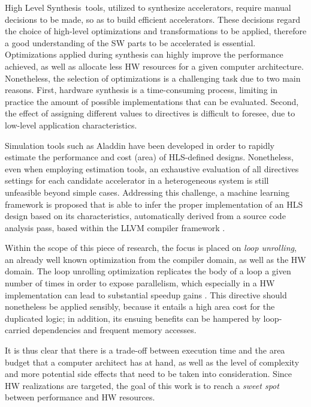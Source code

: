 \documentclass[]{usiinfthesis}
\newcommand{\HLS}{{High Level Synthesis}}
\begin{document}
\HLS\ tools, utilized to synthesize accelerators, require manual decisions to be made, so as 
to build efficient accelerators. These decisions regard the choice of high-level optimizations 
and transformations to be applied, therefore a good understanding of the SW parts to be 
accelerated is essential. Optimizations applied during synthesis can highly improve the performance 
achieved, as well as allocate less HW resources for a given computer architecture. Nonetheless, 
the selection of optimizations is a challenging task due to two main reasons. 
First, hardware synthesis is a time-consuming process, limiting in practice the amount of 
possible implementations that can be evaluated. Second, the effect of assigning different values to 
directives is difficult to foresee, due to low-level application characteristics.\par

Simulation tools such as Aladdin \cite{ShaoJul14} have been developed in order to rapidly 
estimate the performance and cost (area) of HLS-defined designs. Nonetheless, even when employing 
estimation tools, an exhaustive evaluation of all directives settings for each candidate accelerator 
in a heterogeneous system is still unfeasible beyond simple cases. Addressing
this challenge, a machine learning framework is proposed that is able to infer the proper 
implementation of an HLS design based on its characteristics, automatically derived from a source code 
analysis pass, based within the LLVM compiler framework \cite{LattnerMar04}.\par


Within the scope of this piece of research, the focus is placed on {\em loop unrolling}, an already 
well known optimization from the compiler domain, as well as the HW domain.
The loop unrolling optimization replicates the body of a loop a given number of times 
in order to expose parallelism, which especially in a HW implementation can lead to 
substantial speedup gains \cite{KurraApr07}. 
This directive should nonetheless be applied sensibly, because it entails a high area cost for the 
duplicated logic; in addition, its ensuing benefits can be hampered by loop-carried dependencies 
and frequent memory accesses.\par

It is thus clear that there is a trade-off between execution time and the area budget that 
a computer architect has at hand, as well as the level of complexity and more potential 
side effects that need to be taken into consideration. Since HW realizations are targeted, 
the goal of this work is to reach a {\em sweet spot} between performance and HW resources.\par
\end{document}
